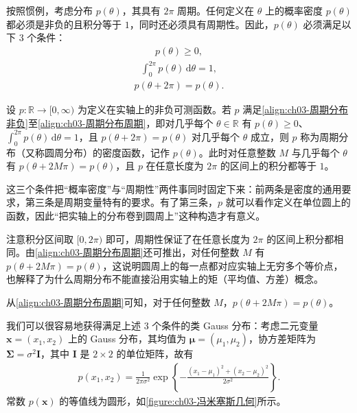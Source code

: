 \documentclass[../../main.tex]{subfiles}
\begin{document}
按照惯例，考虑分布 $p(\theta)$，其具有 $2\pi$ 周期。任何定义在 $\theta$ 上的概率密度 $p(\theta)$ 都必须是非负的且积分等于 $1$，同时还必须具有周期性。因此，$p(\theta)$ 必须满足以下 3 个条件：
\begin{align}
p(\theta)\geqslant0,
\label{align:ch03-周期分布非负}
\end{align}
\begin{align}
\int_{0}^{2\pi}p(\theta)\,\mathrm{d}\theta=1,
\label{align:ch03-周期分布归一}
\end{align}
\begin{align}
p(\theta+2\pi)=p(\theta).
\label{align:ch03-周期分布周期}
\end{align}

\begin{definition}[周期分布]\label{definition:ch03-周期分布}
设 $p:\mathbb{R}\to[0,\infty)$ 为定义在实轴上的非负可测函数。若 $p$ 满足\eqref{align:ch03-周期分布非负}至\eqref{align:ch03-周期分布周期}，即对几乎每个 $\theta\in\mathbb{R}$ 有 $p(\theta)\geqslant0$、$\int_{0}^{2\pi}p(\theta)\,\mathrm{d}\theta=1$，且 $p(\theta+2\pi)=p(\theta)$ 对几乎每个 $\theta$ 成立，则 $p$ 称为周期分布（又称圆周分布）的密度函数，记作 $p(\theta)$。此时对任意整数 $M$ 与几乎每个 $\theta$ 有 $p(\theta+2M\pi)=p(\theta)$，且 $p$ 在任意长度为 $2\pi$ 的区间上的积分都等于 $1$。
\end{definition}

\begin{remark}
这三个条件把“概率密度”与“周期性”两件事同时固定下来：前两条是密度的通用要求，第三条是周期变量特有的要求。有了第三条，$p$ 就可以看作定义在单位圆上的函数，因此“把实轴上的分布卷到圆周上”这种构造才有意义。

注意积分区间取 $[0,2\pi)$ 即可，周期性保证了在任意长度为 $2\pi$ 的区间上积分都相同。由\eqref{align:ch03-周期分布周期}还可推出，对任何整数 $M$ 有 $p(\theta+2M\pi)=p(\theta)$，这说明圆周上的每一点都对应实轴上无穷多个等价点，也解释了为什么周期分布不能直接沿用实轴上的矩（平均值、方差）概念。
\end{remark}

从\eqref{align:ch03-周期分布周期}可知，对于任何整数 $M$，$p(\theta+2M\pi)=p(\theta)$。

我们可以很容易地获得满足上述 3 个条件的类 Gauss 分布：考虑二元变量 $\boldsymbol{x}=(x_1,x_2)$ 上的 Gauss 分布，其均值为 $\boldsymbol{\mu}=(\mu_1,\mu_2)$，协方差矩阵为 $\boldsymbol{\Sigma}=\sigma^{2}\boldsymbol{I}$，其中 $\boldsymbol{I}$ 是 $2\times2$ 的单位矩阵，故有
\begin{align}
p(x_1,x_2)=\frac{1}{2\pi\sigma^{2}}\exp\left\{-\frac{(x_1-\mu_1)^{2}+(x_2-\mu_2)^{2}}{2\sigma^{2}}\right\}.
\label{align:ch03-二维Gauss}
\end{align}
常数 $p(\boldsymbol{x})$ 的等值线为圆形，如\cref{figure:ch03-冯米塞斯几何}所示。
\end{document}
